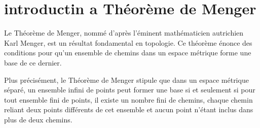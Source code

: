 \section{introductin a Théorème de Menger}


Le Théorème de Menger, nommé d'après l'éminent mathématicien autrichien Karl Menger, est un résultat fondamental en topologie. Ce théorème énonce des conditions pour qu'un ensemble de chemins dans un espace métrique forme une base de ce dernier.

Plus précisément, le Théorème de Menger stipule que dans un espace métrique séparé, un ensemble infini de points peut former une base si et seulement si pour tout ensemble fini de points, il existe un nombre fini de chemins, chaque chemin reliant deux points différents de cet ensemble et aucun point n'étant inclus dans plus de deux chemins.